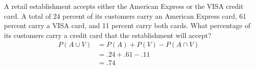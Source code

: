 \item A retail establishment accepts either the American Express or the VISA credit card. A total of 24 percent of its customers carry an American Express card, 61 percent carry a VISA card, and 11 percent carry both cards. What percentage of its customers carry a credit card that the establishment will accept?
\begin{align*}
    P(A\cup V) &= P(A) + P(V) - P(A \cap V)\\
    &= .24 + .61 - .11\\
    &= .74
\end{align*}